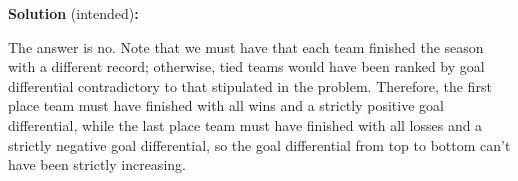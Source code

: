 
\begin{solution}
\textbf{Solution} (intended)\textbf{:}\V

The answer is no. Note that we must have that each team finished the season with a different record; otherwise, tied teams would have been ranked by goal differential contradictory to that stipulated in the problem. Therefore, the first place team must have finished with all wins and a strictly positive goal differential, while the last place team must have finished with all losses and a strictly negative goal differential, so the goal differential from top to bottom can't have been strictly increasing.
\end{solution}\V
